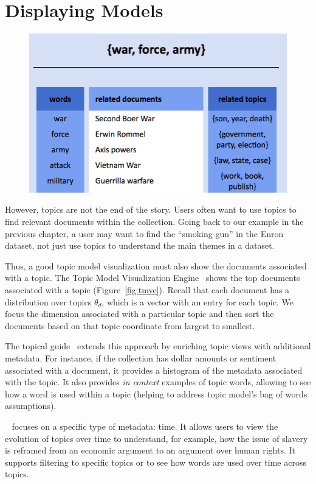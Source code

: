 \section{Displaying Models}

\begin{figure}
  \includegraphics[width=.5\linewidth]{figures/viz_tmve}
  \caption{ }
  \label{fig:llda}
\end{figure}

However, topics are not the end of the story.  Users often want to use topics to
find relevant documents within the collection.  Going back to our example in the
previous chapter, a user may want to find the ``smoking gun'' in the Enron
dataset, not just use topics to understand the main themes in a dataset.

Thus, a good topic model visualization must also show the documents associated
with a topic.  The Topic Model Visualization Engine~\citep{chaney-12} shows the
top documents associated with a topic (Figure~\ref{fig:tmve}).  Recall that each
document has a distribution over topics $\theta_d$, which is a vector with an
entry for each topic.  We focus the dimension associated with a particular topic
and then sort the documents based on that topic coordinate from largest to
smallest.

The topical guide~\citep{gardner-10} extends this approach by enriching topic
views with additional metadata.  For instance, if the collection has dollar
amounts or sentiment~\cite{pang-08} associated with a document, it provides a
histogram of the metadata associated with the topic.  It also provides \emph{in
  context} examples of topic words, allowing to see how a word is used within a
topic (helping to address topic model's bag of words assumptions).

~\citep{eistenstein-14} focuses on a specific type of metadata: time.
It allows users to view the evolution of topics over time to understand, for
example, how the issue of slavery is reframed from an economic argument to an
argument over human rights.  It supports filtering to specific topics or to see
how words are used over time across topics.

